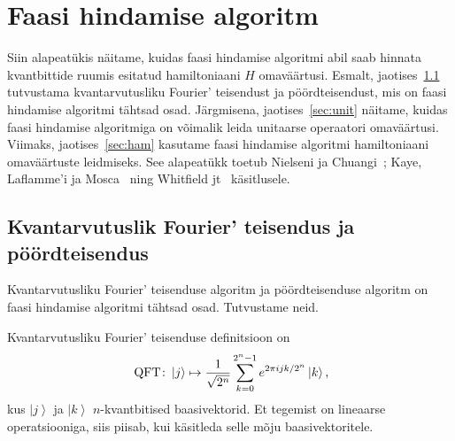 \documentclass[12pt]{report}
\def\ket#1{\left|#1\right>}
\def\QFT{\mathop{\rm QFT}\nolimits}
\begin{document}
\section{Faasi hindamise algoritm}\label{sec:pea}

Siin alapeatükis näitame, kuidas faasi hindamise algoritmi abil saab hinnata kvantbittide ruumis esitatud hamiltoniaani \(H\) omaväärtusi.
Esmalt, jaotises~\ref{sec:qftdef} tutvustama kvantarvutusliku Fourier' teisendust ja pöördteisendust, mis on faasi hindamise algoritmi tähtsad osad.
Järgmisena, jaotises~\ref{sec:unit} näitame, kuidas faasi hindamise algoritmiga on võimalik leida unitaarse operaatori omaväärtusi.
Viimaks, jaotises~\ref{sec:ham} kasutame faasi hindamise algoritmi hamiltoniaani omaväärtuste leidmiseks.
See alapeatükk toetub Nielseni ja Chuangi~\cite{nielsen+chuang}; Kaye, Laflamme'i ja Mosca~\cite{kaye+laflamme+mosca} ning Whitfield jt~\cite{whitfield+etal2011} käsitlusele.

\subsection{Kvantarvutuslik Fourier' teisendus ja pöördteisendus}\label{sec:qftdef}

Kvantarvutusliku Fourier' teisenduse algoritm ja pöördteisenduse algoritm on faasi hindamise algoritmi tähtsad osad.
Tutvustame neid.

Kvantarvutusliku Fourier' teisenduse definitsioon on
\begin{align}\label{eq:qftdef}
    \QFT\colon
    \ket{j} \mapsto \frac{1}{\sqrt{2^n}} \sum_{k=0}^{2^n-1} e^{2\pi ijk/2^n} \ket{k} \rlap{,}
\end{align}
kus \(\ket{j}\) ja \(\ket{k}\) \(n\)-kvantbitised baasivektorid.
Et tegemist on lineaarse operatsiooniga, siis piisab, kui käsitleda selle mõju baasivektoritele.
\end{document}
